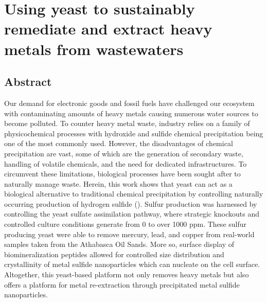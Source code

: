 \documentclass[../main/main]{subfiles}
\begin{document}
\chapter{Using yeast to sustainably remediate and extract heavy metals from wastewaters}
\label{chapter2}
\renewcommand{\figurename}{Figure}

\section*{Abstract}
Our demand for electronic goods and fossil fuels have challenged our ecosystem with contaminating amounts of heavy metals causing numerous water sources to become polluted. To counter heavy metal waste, industry relies on a family of physicochemical processes with hydroxide and sulfide chemical precipitation being one of the most commonly used. However, the disadvantages of chemical precipitation are vast, some of which are the generation of secondary waste, handling of volatile chemicals, and the need for dedicated infrastructures. To circumvent these limitations, biological processes have been sought after to naturally manage waste. Herein, this work shows that yeast can act as a biological alternative to traditional chemical precipitation by controlling naturally occurring production of hydrogen sulfide (\HS{}). Sulfur production was harnessed by controlling the yeast sulfate assimilation pathway, where strategic knockouts and controlled culture conditions generate \HS{} from 0 to over 1000 ppm. These sulfur producing yeast were able to remove mercury, lead, and copper from real-world samples taken from the Athabasca Oil Sands. More so, surface display of biomineralization peptides allowed for controlled size distribution and crystallinity of metal sulfide nanoparticles which can nucleate on the cell surface. Altogether, this yeast-based platform not only removes heavy metals but also offers a platform for metal re-extraction through precipitated metal sulfide nanoparticles.

\end{document}
